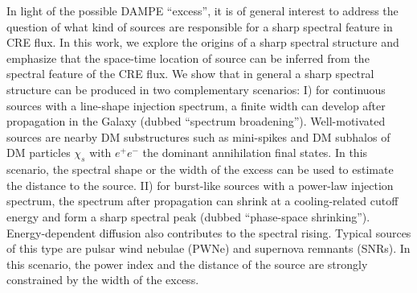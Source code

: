 \documentclass[aps,prl,twocolumn,a4paper]{revtex4}
\newcommand{\note}[1]{#1}{\ignorespacesafterend}
\begin{document}
\note{
In light of the possible DAMPE ``excess'',
it is of general interest to address the question of 
what kind of sources are responsible for a sharp
spectral feature in CRE flux.}
In this work, 
we explore the origins of a sharp spectral structure and 
emphasize  that  the space-time location of  source can be inferred from 
the spectral feature of the CRE flux.
We show that in general a sharp spectral structure can be produced   in two  complementary scenarios:
I)
for  continuous sources with a line-shape injection spectrum, 
a  finite width can develop after propagation in the Galaxy
(dubbed ``spectrum broadening'').
Well-motivated  sources are nearby DM substructures 
such as mini-spikes and DM subhalos of DM particles $\chi_{s}$
with  $e^{+}e^{-}$ the dominant annihilation final states.
In this scenario, the spectral shape or the width of the excess can be used to estimate  
the distance to the source.
II)
for burst-like sources with a power-law injection spectrum,
the spectrum after propagation can shrink at a cooling-related cutoff energy 
and form a sharp spectral peak  (dubbed ``phase-space shrinking'').
Energy-dependent diffusion also contributes  to the spectral rising. 
Typical  sources of this type are pulsar wind nebulae (PWNe) and 
supernova remnants (SNRs).
In this scenario, the power index and the distance of the source are strongly 
constrained by the width of the excess.
\end{document}
